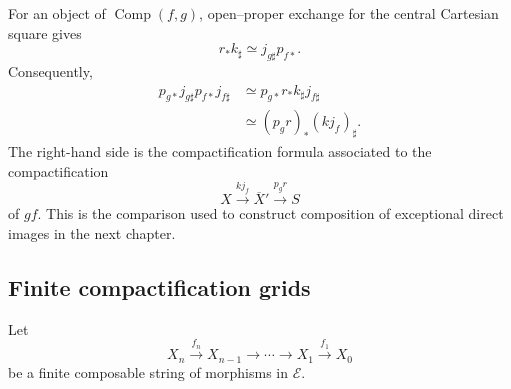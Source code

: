 \begin{remark}
\label{rem:composition-data-exceptional-formula}
For an object of \(\operatorname{Comp}(f,g)\), open--proper exchange for the
central Cartesian square gives
\[
    r_*k_\sharp
    \simeq
    j_{g\sharp}p_{f*}.
\]
Consequently,
\[
\begin{aligned}
    p_{g*}j_{g\sharp}p_{f*}j_{f\sharp}
    &\simeq
    p_{g*}r_*k_\sharp j_{f\sharp} \\
    &\simeq
    (p_gr)_*(kj_f)_\sharp.
\end{aligned}
\]
The right-hand side is the compactification formula associated to the
compactification
\[
    X\xrightarrow{kj_f}\overline X'\xrightarrow{p_gr}S
\]
of \(gf\).  This is the comparison used to construct composition of
exceptional direct images in the next chapter.
\end{remark}

\subsection{Finite compactification grids}

Let
\[
    X_n
    \xrightarrow{f_n}
    X_{n-1}
    \longrightarrow
    \cdots
    \longrightarrow
    X_1
    \xrightarrow{f_1}
    X_0
\]
be a finite composable string of morphisms in \(\mathcal E\).

